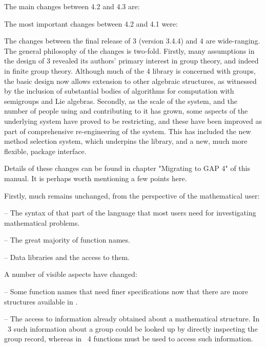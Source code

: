 The main changes between {\GAP} 4.2 and {\GAP} 4.3 are:


The most important changes between {\GAP} 4.2 and {\GAP} 4.1 were:


The changes between the final release of {\GAP} 3 (version 3.4.4) and
{\GAP} 4 are  wide-ranging.  The general philosophy of the
changes is two-fold.  Firstly, many assumptions in the design of
{\GAP} 3 revealed its authors' primary interest in group theory, and
indeed in finite group theory. Although much of the {\GAP} 4 library
is concerned with groups, the basic design now allows extension to
other algebraic structures, as witnessed by the inclusion of
substantial bodies of algorithms for computation with semigroups and
Lie algebras.  Secondly, as the scale of the system, and the number of
people using and contributing to it has grown, some aspects of the
underlying system have proved to be restricting, and these have been
improved as part of comprehensive re-engineering of the system. This
has included the new method selection system, which underpins the
library, and a new, much more flexible, {\GAP} package interface.

Details of these changes can be found in chapter "Migrating to GAP 4" of
this manual. It is perhaps worth mentioning a few points here. 

Firstly, much remains unchanged, from the perspective of the mathematical 
user:

\beginlist%
  \item{--}
    The syntax of that part  of the {\GAP} language  that most users need
    for investigating mathematical problems.

  \item{--}
    The great majority of function names.

  \item{--}
    Data libraries and the access to them.
\endlist

A number of visible aspects have changed:

\beginlist%
  \item{--}
    Some function names that need finer specifications now that there are
    more structures available in {\GAP}.

  \item{--}  
    The    access to information   already  obtained about a mathematical
    structure. In {\GAP}~3 such information about a group could be looked
    up  by  directly inspecting  the  group record,  whereas in  {\GAP}~4
    functions must be used to access such information.
\endlist

